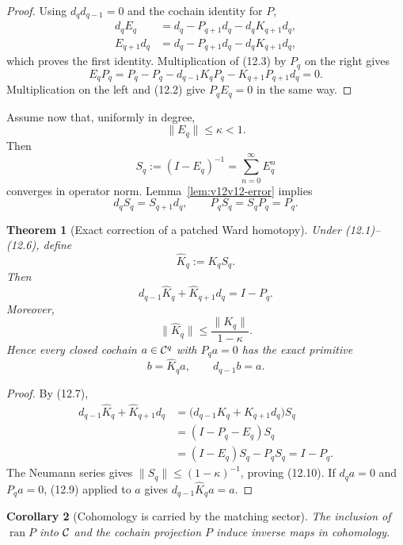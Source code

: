 \documentclass[11pt]{article}
\newtheorem{theorem}{Theorem}[section]
\newtheorem{corollary}[theorem]{Corollary}
\theoremstyle{remark}
\begin{document}
\begin{proof}
Using \(d_qd_{q-1}=0\) and the cochain identity for \(P\),
\[
\begin{split}
 d_qE_q
 &=d_q-P_{q+1}d_q-d_qK_{q+1}d_q,\\
 E_{q+1}d_q
 &=d_q-P_{q+1}d_q-d_qK_{q+1}d_q,
\end{split}
\]
which proves the first identity.  Multiplication of (12.3) by \(P_q\)
on the right gives
\[
 E_qP_q=P_q-P_q-d_{q-1}K_qP_q-K_{q+1}P_{q+1}d_q=0.
\]
Multiplication on the left and (12.2) give \(P_qE_q=0\) in the same
way.
\end{proof}

Assume now that, uniformly in degree,
\[
 \|E_q\|\le\kappa<1.                                       \tag{12.5}
\]
Then
\[
 S_q:=(I-E_q)^{-1}=\sum_{n=0}^{\infty}E_q^n                \tag{12.6}
\]
converges in operator norm.  Lemma~\ref{lem:v12v12-error} implies
\[
 d_qS_q=S_{q+1}d_q,\qquad P_qS_q=S_qP_q=P_q.               \tag{12.7}
\]

\begin{theorem}[Exact correction of a patched Ward homotopy]
\label{thm:v12v12-correction}
Under (12.1)--(12.6), define
\[
                         \widehat K_q:=K_qS_q.              \tag{12.8}
\]
Then
\[
 \boxed{
 d_{q-1}\widehat K_q+\widehat K_{q+1}d_q=I-P_q.}            \tag{12.9}
\]
Moreover,
\[
 \|\widehat K_q\|
 \le\frac{\|K_q\|}{1-\kappa}.                              \tag{12.10}
\]
Hence every closed cochain \(a\in{\cal C}^q\) with \(P_qa=0\) has
the exact primitive
\[
                         b=\widehat K_q a,\qquad d_{q-1}b=a.
                                                               \tag{12.11}
\]
\end{theorem}

\begin{proof}
By (12.7),
\[
\begin{split}
 d_{q-1}\widehat K_q+\widehat K_{q+1}d_q
 &=
 \bigl(d_{q-1}K_q+K_{q+1}d_q\bigr)S_q\\
 &=(I-P_q-E_q)S_q\\
 &=(I-E_q)S_q-P_qS_q=I-P_q.
\end{split}                                                  \tag{12.12}
\]
The Neumann series gives
\(\|S_q\|\le(1-\kappa)^{-1}\), proving (12.10).  If \(d_qa=0\) and
\(P_qa=0\), (12.9) applied to \(a\) gives
\(d_{q-1}\widehat K_qa=a\).
\end{proof}

\begin{corollary}[Cohomology is carried by the matching sector]
\label{cor:v12v12-cohomology}
The inclusion of \(\operatorname{ran}P\) into \({\cal C}\) and the
cochain projection \(P\) induce inverse maps in cohomology.
\end{corollary}
\end{document}

